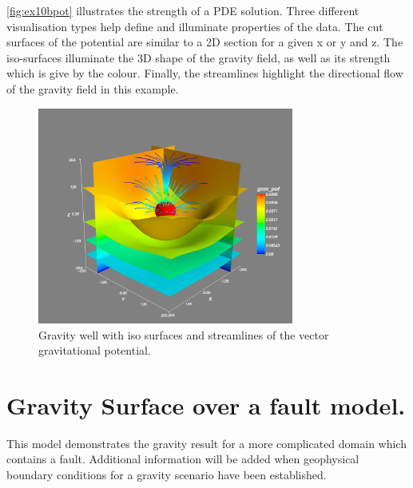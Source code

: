\autoref{fig:ex10bpot} illustrates the strength of a PDE solution. Three
different visualisation types help define and illuminate properties of the data.
The cut surfaces of the potential are similar to a 2D section for a given x or y
and z. The iso-surfaces illuminate the 3D shape of the gravity field, as well as
its strength which is give by the colour. Finally, the streamlines highlight the
directional flow of the gravity field in this example.

\begin{figure}[htp]
\centering
\includegraphics[width=0.75\textwidth]{figures/ex10bpot.png}
\caption{Gravity well with iso surfaces and streamlines of the vector
gravitational potential.}
\label{fig:ex10bpot}
\end{figure}

\section{Gravity Surface over a fault model.}
This model demonstrates the gravity result for a more complicated domain which
contains a fault. Additional information will be added when geophysical boundary
conditions for a gravity scenario have been established.

